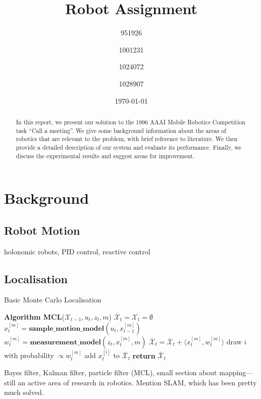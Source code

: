 \documentclass[conference]{IEEEtran}
\title{Robot Assignment}
\author{951926 \and 1001231 \and 1024072 \and 1028907}
\date{\today}
\begin{document}
\maketitle

\begin{abstract}
  In this report, we present our solution to the 1996 AAAI Mobile Robotics Competition task ``Call a meeting''\cite{AAAIcomp}. We give some background information about the areas of robotics that are relevant to the problem, with brief reference to literature. We then provide a detailed description of our system and evaluate its performance. Finally, we discuss the experimental results and suggest areas for improvement.
\end{abstract}
\section{Background}
\subsection{Robot Motion}
holonomic robots, PID control, reactive control
\subsection{Localisation}
\begin{algorithm}
  \caption{Basic Monte Carlo Localisation\cite{thrun}}
  \label{alg:basicMCL}
  \begin{algorithmic}[1]
    \State \textbf{Algorithm MCL}\textnormal{($\mathcal{X}_{t-1}, u_t, z_t, m$)}
    \State $\bar{\mathcal{X}}_t=\mathcal{X}_t=\emptyset$
    \State $x_t^{[m]}=\textbf{sample\_motion\_model}(u_t,x_{t-1}^{[m]})$
    \State $w_t^{[m]}=\textbf{measurement\_model}(z_t,x_t^{[m]},m)$
    \State $\bar{\mathcal{X}}_t=\bar{\mathcal{X}}_t+\langle x_t^{[m]},w_t^{[m]}\rangle$
    \EndFor
    \State \textnormal{draw $i$ with probability $\propto w_t^{[m]}$}
    \State \textnormal{add $x_t^{[i]}$ to $\bar{\mathcal{X}}_t$}
    \EndFor
    \State \textbf{return} $\bar{\mathcal{X}}_t$
  \end{algorithmic}
\end{algorithm}
Bayes filter, Kalman filter, particle filter (MCL), small section about mapping---still an active area of research in robotics. Mention SLAM, which has been pretty much solved.
\end{document}
